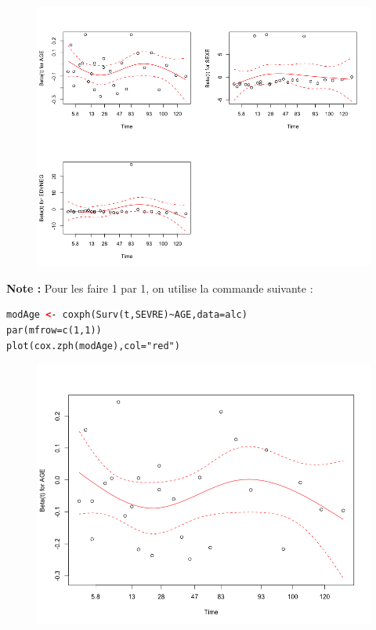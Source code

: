 \begin{figure}[H]\begin{center}\includegraphics[scale=0.5]{ilu/dsurv5.png}\end{center}\end{figure}

\textbf{Note :} Pour les faire 1 par 1, on utilise la commande suivante : 
\begin{lstlisting}[language=html]
modAge <- coxph(Surv(t,SEVRE)~AGE,data=alc)
par(mfrow=c(1,1))
plot(cox.zph(modAge),col="red")
\end{lstlisting}

\begin{figure}[H]\begin{center}\includegraphics[scale=0.5]{ilu/dsurv6.png}\end{center}\end{figure}

